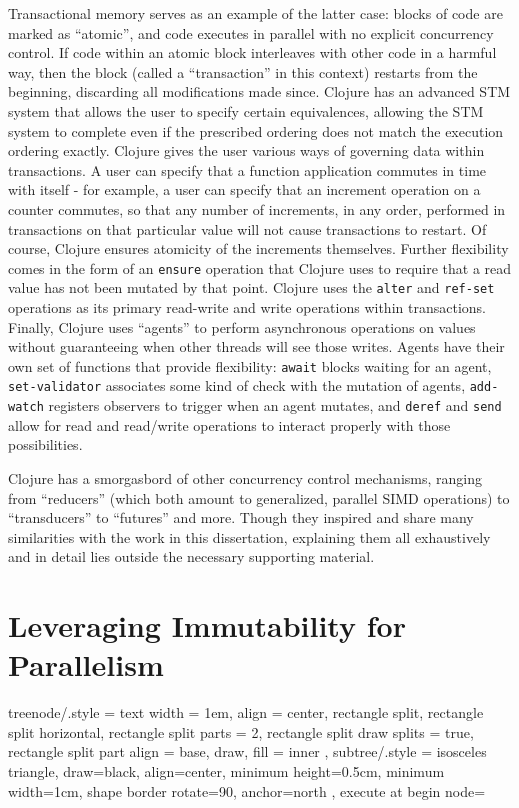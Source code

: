 Transactional memory serves as an example of the latter case: blocks of code are
marked as ``atomic'', and code executes in parallel with no explicit concurrency
control. If code within an atomic block interleaves with other code in a harmful
way, then the block (called a ``transaction'' in this context) restarts from the
beginning, discarding all modifications made since. Clojure has an advanced STM
system that allows the user to specify certain equivalences, allowing the STM
system to complete even if the prescribed ordering does not match the execution
ordering exactly.  Clojure gives the user various ways of governing data within
transactions. A user can specify that a function application commutes in time
with itself \-- for example, a user can specify that an increment operation on a
counter commutes, so that any number of increments, in any order, performed in
transactions on that particular value will not cause transactions to restart. Of
course, Clojure ensures atomicity of the increments themselves. Further
flexibility comes in the form of an \texttt{ensure} operation that Clojure uses to
require that a read value has not been mutated by that point. Clojure uses the
\texttt{alter} and \texttt{ref-set} operations as its primary read-write and write
operations within transactions. Finally, Clojure uses ``agents'' to perform
asynchronous operations on values without guaranteeing when other threads will
see those writes. Agents have their own set of functions that provide
flexibility: \texttt{await} blocks waiting for an agent, \texttt{set-validator}
associates some kind of check with the mutation of agents, \texttt{add-watch}
registers observers to trigger when an agent mutates, and \texttt{deref} and
\texttt{send} allow for read and read/write operations to interact properly with
those possibilities.

Clojure has a smorgasbord of other concurrency control mechanisms, ranging from
``reducers'' (which both amount to generalized, parallel SIMD operations) to
``transducers'' to ``futures'' and more. Though they inspired and share many
similarities with the work in this dissertation, explaining them all
exhaustively and in detail lies outside the necessary supporting material.

\section{Leveraging Immutability for Parallelism}
\tikzset
{
    treenode/.style = {
        text width = 1em, align = center, rectangle split,
        rectangle split horizontal,
        rectangle split parts = 2,
        rectangle split draw splits = true,
        rectangle split part align = base,
        draw, fill = inner
    },
    subtree/.style = {
        isosceles triangle, draw=black, align=center,
        minimum height=0.5cm, minimum width=1cm,
        shape border rotate=90, anchor=north
    },
    execute at begin node=\strut
}


